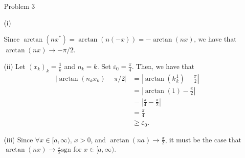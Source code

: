 \documentclass[8pt]{extarticle}
\begin{document}
\begin{problem}{Problem 3}
\begin{problem}{(i)}
\begin{description}
          Since $\arctan(nx^{\ast}) = \arctan(n(-x)) = -\arctan(nx)$, we have that $\arctan(nx) \rightarrow -\pi/2$.
      \end{description}
    \end{problem}
    \begin{problem}{(ii)}
      Let $(x_k)_k = \frac{1}{k}$ and $n_k = k$. Set $\varepsilon_0 = \frac{\pi}{4}$. Then, we have that
      \begin{align*}
        \left|\arctan(n_kx_k) - \pi/2\right| &= \left|\arctan\left(k\frac{1}{k}\right) - \frac{\pi}{2}\right|\\
                                             &= \left|\arctan(1)-\frac{\pi}{2}\right|\\
                                             &= \left|\frac{\pi}{4}-\frac{\pi}{2}\right|\\
                                             &=\frac{\pi}{4}\\
                                             &\geq \varepsilon_0.
      \end{align*}
    \end{problem}
    \begin{problem}{(iii)}
      Since $\forall x\in [a,\infty)$, $x > 0$, and $\arctan(na) \rightarrow \frac{\pi}{2}$, it must be the case that $\arctan(nx) \rightarrow \frac{\pi}{2}\text{sgn}$ for $x\in [a,\infty)$.
    \end{problem}
  \end{problem}
\end{document}
